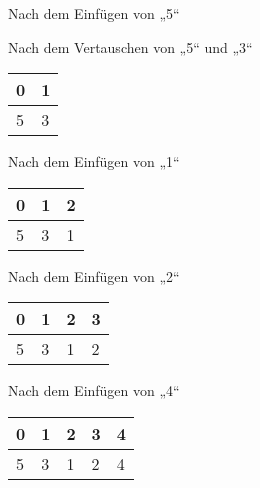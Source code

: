 \documentclass{bschlangaul-aufgabe}
\begin{document}
\begin{enumerate}
\begin{enumerate}
\begin{bBaum}{Nach dem Einfügen von „5“}
\end{bBaum}

\begin{bBaum}{Nach dem Vertauschen von „5“ und „3“}
\begin{tabular}{ll}
\bf{0} & \bf{1} \\
\hline
5      & 3      \\
\end{tabular}

\end{bBaum}

\begin{bBaum}{Nach dem Einfügen von „1“}
\begin{tabular}{lll}
\bf{0} & \bf{1} & \bf{2} \\
\hline
5      & 3      & 1      \\
\end{tabular}

\end{bBaum}

\begin{bBaum}{Nach dem Einfügen von „2“}
\begin{tabular}{llll}
\bf{0} & \bf{1} & \bf{2} & \bf{3} \\
\hline
5      & 3      & 1      & 2      \\
\end{tabular}

\end{bBaum}

\begin{bBaum}{Nach dem Einfügen von „4“}
\begin{tabular}{lllll}
\bf{0} & \bf{1} & \bf{2} & \bf{3} & \bf{4} \\
\hline
5      & 3      & 1      & 2      & 4      \\
\end{tabular}


\end{bBaum}
\end{enumerate}
\end{enumerate}
\end{document}
